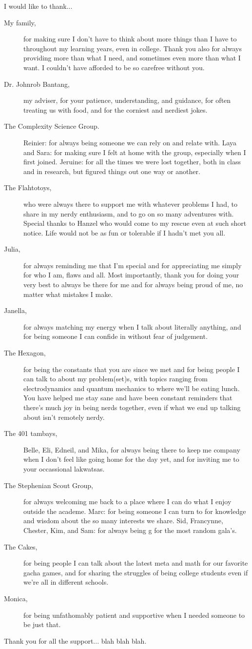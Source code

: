 I would like to thank...
\begin{description}
    \item[My family,] for making sure I don't have to think about more things than I have to throughout my learning years, even in college. Thank you also for always providing more than what I need, and sometimes even more than what I want. I couldn't have afforded to be so carefree without you.
    \item[Dr. Johnrob Bantang,] my adviser, for your patience, understanding, and guidance, for often treating us with food, and for the corniest and nerdiest jokes.
    \item[The Complexity Science Group.] Reinier: for always being someone we can rely on and relate with. Laya and Sara: for making sure I felt at home with the group, especially when I first joined. Jeruine: for all the times we were lost together, both in class and in research, but figured things out one way or another.
    \item[The Flahtotoys,] who were always there to support me with whatever problems I had, to share in my nerdy enthusiasm, and to go on so many adventures with. Special thanks to Hanzel who would come to my rescue even at such short notice. Life would not be as fun or tolerable if I hadn't met you all.
    \item[Julia,] for always reminding me that I'm special and for appreciating me simply for who I am, flaws and all. Most importantly, thank you for doing your very best to always be there for me and for always being proud of me, no matter what mistakes I make.
    \item[Janella,] for always matching my energy when I talk about literally anything, and for being someone I can confide in without fear of judgement.
    \item[The Hexagon,] for being the constants that you are since we met and for being people I can talk to about my problem(set)s, with topics ranging from electrodynamics and quantum mechanics to where we'll be eating lunch. You have helped me stay sane and have been constant reminders that there's much joy in being nerds together, even if what we end up talking about isn't remotely nerdy.
    \item[The 401 tambays,] Belle, Eli, Edneil, and Mika, for always being there to keep me company when I don't feel like going home for the day yet, and for inviting me to your occassional lakwatsas.
    \item[The Stephenian Scout Group,] for always welcoming me back to a place where I can do what I enjoy outside the academe. Marc: for being someone I can turn to for knowledge and wisdom about the so many interests we share. Sid, Francynne, Chester, Kim, and Sam: for always being g for the most random gala's.
    \item[The Cakes,] for being people I can talk about the latest meta and math for our favorite gacha games, and for sharing the struggles of being college students even if we're all in different schools.
    \item[Monica,] for being unfathomably patient and supportive when I needed someone to be just that.
\end{description}
Thank you for all the support... blah blah blah.
